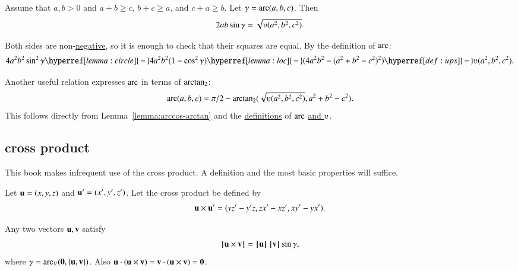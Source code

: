 \begin{lemma}\label{lemma:los}
Assume that $a,b>0$ and $a+b\ge c$, $b+c\ge a$, and $c+a\ge b$.
Let $\gamma=\operatorname{arc}(a,b,c)$.  Then
\begin{displaymath}2 a b \sin\gamma =
  \sqrt{\ups(a^2,b^2,c^2)}.\end{displaymath}
\end{lemma}
%
%
%
\begin{proved}
  Both sides are non-\hyperref[lemma:sin-pos]{negative}, so it is
  enough to check that their squares are equal.  By the definition of
  $\operatorname{arc}$:
\begin{displaymath}
4 a^2 b^2 \sin^2\gamma 
\hyperref[lemma:circle]{\,=\,} 4 a^2 b^2 (1-\cos^2\gamma) 
\hyperref[lemma:loc]{\,=\,} (4 a^2 b^2 - (a^2 + b^2 -
c^2)^2) 
\hyperref[def:ups]{\,=\,} \ups(a^2,b^2,c^2).\end{displaymath}
\swallowed\end{proved}

Another useful relation expresses $\operatorname{arc}$ in terms of ${\operatorname{arctan_2}}$:
\begin{displaymath}
\arc(a,b,c) = 
\pi/2 - \atn({\sqrt{\ups(a^2,b^2,c^2)}},{ a^2 + b^2 - c^2}).
\end{displaymath}
This follows directly from Lemma~\ref{lemma:arccos-arctan} and the
\hyperref[def:arc]{definitions} of $\operatorname{arc}$ \hyperref[def:ups]{and
  $\ups$}.



\subsection{cross product} 

This book makes infrequent use of the cross product.
A definition and the most basic properties will suffice.

\begin{definition}\label{def:cross}   
Let ${\mathbf u} =(x,y,z)$ and ${\mathbf u}' = (x',y',z')$.  
Let the cross product be defined
by
\begin{displaymath}
{\mathbf u} \times {\mathbf u}' = (y z' - y' z, z x' - x z', x y' - y x').
\end{displaymath}
%
%
%
\end{definition}

\begin{lemma}[]  
Any two vectors ${\mathbf u},{\mathbf v}$ satisfy
\begin{displaymath}{{\hskip0.1em|\hskip-0.15em|\hskip0.1em}{\mathbf u}\times {\mathbf v}{\hskip0.1em|\hskip-0.15em|\hskip0.1em}} =
  {{\hskip0.1em|\hskip-0.15em|\hskip0.1em}{\mathbf u}{\hskip0.1em|\hskip-0.15em|\hskip0.1em}}\,{{\hskip0.1em|\hskip-0.15em|\hskip0.1em}{\mathbf v}{\hskip0.1em|\hskip-0.15em|\hskip0.1em}}\sin\gamma,\end{displaymath}
where $\gamma=\operatorname{arc}_V({\mathbf 0},\{{\mathbf u},{\mathbf v}\})$.
Also ${\mathbf u} \cdot ({\mathbf u}\times {\mathbf v}) = {\mathbf v}\cdot ({\mathbf u}\times {\mathbf v}) = {\mathbf 0}$.
\end{lemma}

